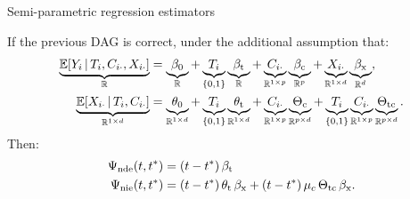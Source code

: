 \documentclass[aspectratio=169]{beamer}
\theoremstyle{remark}
\begin{document}
\begin{frame}{Semi-parametric regression estimators}

    If the previous DAG is correct, under the additional assumption that:
    \begin{equation*}
        \begin{aligned}
            \underbrace{\E[T_i, \C_{i \cdot}, \X_{i \cdot}]{Y_i}}_{\R}
             & = \underbrace{\betazero}_{\R}
            + \underbrace{T_i}_{\{0, 1\}} \underbrace{\betat}_{\R}
            + \underbrace{\C_{i \cdot}}_{\R^{1 \times p}} \underbrace{\betac}_{\R^{p}}
            + \underbrace{\X_{i \cdot}}_{\R^{1 \times d}} \underbrace{\betax}_{\R^d}, \\
            \underbrace{\E[T_i, \C_{i \cdot}]{\X_{i \cdot}}}_{\R^{1 \times d}}
             & = \underbrace{\thetazero}_{\R^{1 \times d}}
            + \underbrace{T_i}_{\{0, 1\}} \underbrace{\thetat}_{\R^{1 \times d}}
            + \underbrace{\C_{i \cdot}}_{\R^{1 \times p}} \underbrace{\Thetac}_{\R^{p \times d}}
            + \underbrace{T_i}_{\{0, 1\}} \underbrace{\C_{i \cdot}}_{\R^{1 \times p}} \underbrace{\Thetatc}_{\R^{p \times d}}.
        \end{aligned}
    \end{equation*}
    Then:
    \begin{align*}
        \ndef & = \paren*{t - t^*} \, \betat                                                        \\
        \nief & = \paren*{t - t^*} \, \thetat \, \betax + (t - t^*) \, \mu_c \, \Thetatc \, \betax.
    \end{align*}

\end{frame}



\end{document}
